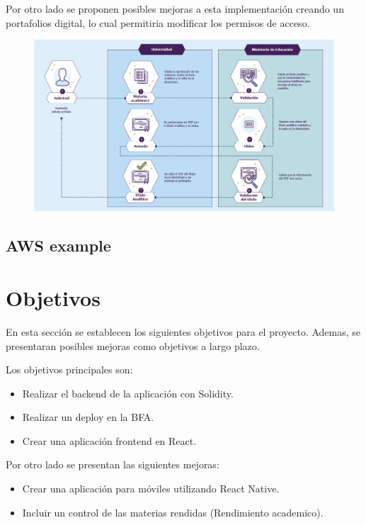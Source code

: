 \documentclass[11pt,a4paper]{article}
\begin{document}
        Por otro lado se proponen posibles mejoras a esta implementación creando un portafolios digital, lo cual 
        permitiria modificar los permisos de acceso.

        \begin{figure}
            \centering
            \includegraphics[width=\textwidth]{Img/cuadro_problematica.png}
            \caption{}
            \label{fig:cuadro_problematica}
        \end{figure}

        \subsection{AWS example}
    \section{Objetivos}

        En esta sección se establecen los siguientes objetivos para el proyecto. Ademas,  
        se presentaran posibles mejoras como objetivos a largo plazo.

        Los objetivos principales son:

        \begin{itemize}
            \item Realizar el backend de la aplicación con Solidity.
            \item Realizar un deploy en la BFA.
            \item Crear una aplicación frontend en React.
        \end{itemize}

        Por otro lado se presentan las siguientes mejoras:

        \begin{itemize}
            \item Crear una aplicación para móviles utilizando React Native.
            \item Incluir un control de las materias rendidas (Rendimiento academico).
        \end{itemize}
\end{document}
